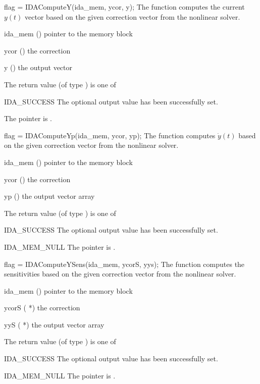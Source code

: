 {
  flag = IDAComputeY(ida\_mem, ycor, y);
}
{
  The function computes the current $y(t)$ vector based on the given correction
  vector from the nonlinear solver.
}
{
  \begin{args}
    \item[ida\_mem] () pointer to the {\idas} memory block
    \item[ycor] () the correction
    \item[y] () the output vector
  \end{args}
}
{
  The return value  (of type ) is one of
  \begin{args}
  \item[IDA\_SUCCESS]
    The optional output value has been successfully set.
  \item[\Id{IDA\_MEM\_NULL}]
    The  pointer is .
  \end{args}
}
{}

{
  flag = IDAComputeYp(ida\_mem, ycor, yp);
}
{
  The function computes $\dot{y}(t)$ based on the given correction
  vector from the nonlinear solver.
}
{
  \begin{args}
    \item[ida\_mem] () pointer to the {\idas} memory block
    \item[ycor] () the correction
    \item[yp] () the output vector array
  \end{args}
}
{
  The return value  (of type ) is one of
  \begin{args}
  \item[IDA\_SUCCESS]
    The optional output value has been successfully set.
  \item[IDA\_MEM\_NULL]
    The  pointer is .
  \end{args}
}
{}

{
  flag = IDAComputeYSens(ida\_mem, ycorS, yys);
}
{
  The function computes the sensitivities based on the given correction
  vector from the nonlinear solver.
}
{
  \begin{args}
    \item[ida\_mem] () pointer to the {\idas} memory block
    \item[ycorS] ( *) the correction
    \item[yyS] ( *) the output vector array
  \end{args}
}
{
  The return value  (of type ) is one of
  \begin{args}
  \item[IDA\_SUCCESS]
    The optional output value has been successfully set.
  \item[IDA\_MEM\_NULL]
    The  pointer is .
  \end{args}
}
{}

